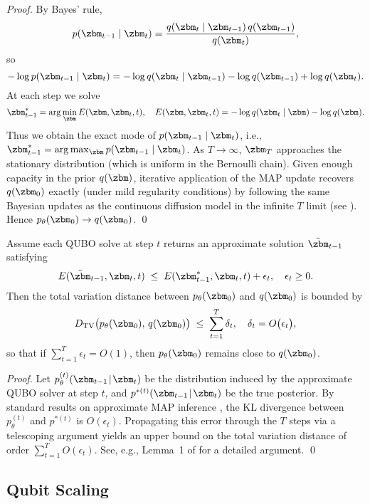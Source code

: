 \documentclass[11pt,letterpaper]{article}
\begin{document}
\begin{proof}
By Bayes' rule,
\[
p(\zbm_{t-1} \mid \zbm_t) 
= \frac{q(\zbm_t \mid \zbm_{t-1})\,q(\zbm_{t-1})}{q(\zbm_t)}, 
\]
so
\[
-\log p(\zbm_{t-1} \mid \zbm_t) = -\log q(\zbm_t \mid \zbm_{t-1}) - \log q(\zbm_{t-1}) + \log q(\zbm_t).
\]
At each step we solve
\[
\zbm_{t-1}^* = \arg\min_{\zbm} E(\zbm,\zbm_t,t), 
\quad E(\zbm,\zbm_t,t) = -\log q(\zbm_t \mid \zbm)
- \log q(\zbm).
\]
Thus we obtain the exact mode of $p(\zbm_{t-1} \mid \zbm_t)$, i.e., $\zbm_{t-1}^* = \arg\max_{\zbm} p(\zbm_{t-1} \mid \zbm_t)$. As $T\to\infty$, $\zbm_T$ approaches the stationary distribution (which is uniform in the Bernoulli chain). Given enough capacity in the prior $q(\zbm)$, iterative application of the MAP update recovers $q(\zbm_0)$ exactly (under mild regularity conditions) by following the same Bayesian updates as the continuous diffusion model in the infinite $T$ limit (see \cite{sohl2015deep}). Hence $p_\theta(\zbm_0) \to q(\zbm_0)$.
\qed
\end{proof}

\begin{theorem}
\label{thm:imperfect-convergence}
Assume each QUBO solve at step $t$ returns an approximate solution $\tilde{\zbm}_{t-1}$ satisfying
\[
E(\tilde{\zbm}_{t-1},\zbm_t,t) 
\;\le\; E(\zbm_{t-1}^*,\zbm_t,t) + \epsilon_t, 
\quad \epsilon_t \ge 0.
\]
Then the total variation distance between $p_\theta(\zbm_0)$ and $q(\zbm_0)$ is bounded by
\[
D_{\mathrm{TV}}\bigl(p_\theta(\zbm_0),\,q(\zbm_0)\bigr) 
\;\le\; \sum_{t=1}^T \delta_t, 
\quad \delta_t = O\bigl(\epsilon_t\bigr),
\]
so that if $\sum_{t=1}^T \epsilon_t = O(1)$, then $p_\theta(\zbm_0)$ remains close to $q(\zbm_0)$.
\end{theorem}

\begin{proof}
Let $p^{(t)}_\theta(\zbm_{t-1} \!\mid\!\zbm_t)$ be the distribution induced by the approximate QUBO solver at step $t$, and $p^{*(t)}(\zbm_{t-1}\!\mid\!\zbm_t)$ be the true posterior. By standard results on approximate MAP inference \cite{mcallester2009convergence}, the KL divergence between $p^{(t)}_\theta$ and $p^{*(t)}$ is $O(\epsilon_t)$. Propagating this error through the $T$ steps via a telescoping argument yields an upper bound on the total variation distance of order $\sum_{t=1}^T O(\epsilon_t)$. See, e.g., Lemma~1 of \citet{li2018approximation} for a detailed argument. \qed
\end{proof}

\subsection{Qubit Scaling}
\label{subsec:qubit-scaling}
\end{document}

